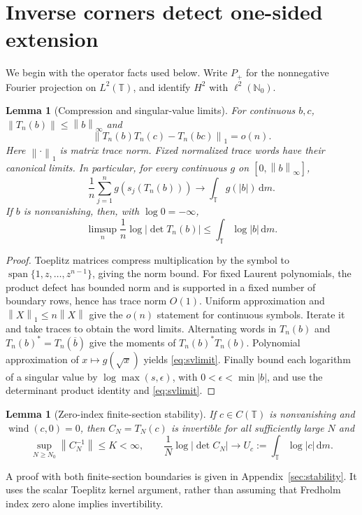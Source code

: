 \documentclass[11pt]{article}
\newtheorem{lemma}[theorem]{Lemma}
\theoremstyle{definition}
\newcommand{\T}{\mathbb T}
\newcommand{\N}{\mathbb N}
\newcommand{\dd}{\,\mathrm d}
\newcommand{\norm}[1]{\left\lVert #1\right\rVert}
\newcommand{\wind}{\operatorname{wind}}
\begin{document}
\section{Inverse corners detect one-sided extension}
We begin with the operator facts used below. Write $P_+$ for the nonnegative Fourier projection on $L^2(\T)$, and identify $H^2$ with $\ell^2(\N_0)$.

\begin{lemma}[Compression and singular-value limits]\label{lem:calculus}
For continuous $b,c$, $\norm{T_n(b)}\le\norm b_\infty$ and
\[
 \norm{T_n(b)T_n(c)-T_n(bc)}_1=o(n).
\]
Here $\norm{\cdot}_1$ is matrix trace norm. Fixed normalized trace words have their canonical limits. In particular, for every continuous $g$ on $[0,\norm b_\infty]$,
\begin{equation}
 \frac1n\sum_{j=1}^n g(s_j(T_n(b)))\longrightarrow\int_\T g(|b|)\dd m.
 \label{eq:svlimit}
\end{equation}
If $b$ is nonvanishing, then, with $\log0=-\infty$,
\begin{equation}
 \limsup_n\frac1n\log|\det T_n(b)|\le\int_\T\log|b|\dd m.
 \label{eq:detupper}
\end{equation}
\end{lemma}
\begin{proof}
Toeplitz matrices compress multiplication by the symbol to $\operatorname{span}\{1,z,\ldots,z^{n-1}\}$, giving the norm bound. For fixed Laurent polynomials, the product defect has bounded norm and is supported in a fixed number of boundary rows, hence has trace norm $O(1)$. Uniform approximation and $\norm X_1\le n\norm X$ give the $o(n)$ statement for continuous symbols. Iterate it and take traces to obtain the word limits. Alternating words in $T_n(b)$ and $T_n(b)^*=T_n(\overline b)$ give the moments of $T_n(b)^*T_n(b)$. Polynomial approximation of $x\mapsto g(\sqrt x)$ yields \eqref{eq:svlimit}. Finally bound each logarithm of a singular value by $\log\max(s,\epsilon)$, with $0<\epsilon<\min|b|$, and use the determinant product identity and \eqref{eq:svlimit}.
\end{proof}

\begin{lemma}[Zero-index finite-section stability]\label{lem:stability}
If $c\in C(\T)$ is nonvanishing and $\wind(c,0)=0$, then $C_N=T_N(c)$ is invertible for all sufficiently large $N$ and
\begin{equation}
 \sup_{N\ge N_0}\norm{C_N^{-1}}\le K<\infty,
 \qquad
 \frac1N\log|\det C_N|\longrightarrow U_c:=\int_\T\log|c|\dd m.
 \label{eq:stable}
\end{equation}
\end{lemma}
A proof with both finite-section boundaries is given in Appendix~\ref{sec:stability}. It uses the scalar Toeplitz kernel argument, rather than assuming that Fredholm index zero alone implies invertibility.
\end{document}
